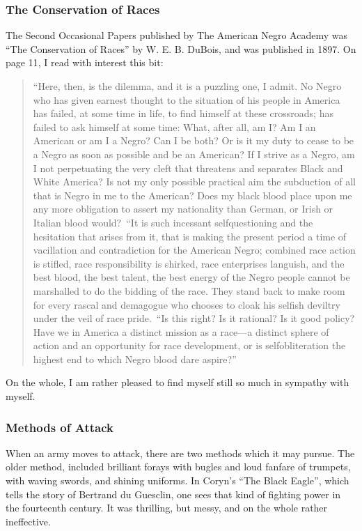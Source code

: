 \documentclass[letterpaper,10pt,english]{jupyterBook}
\begin{document}
\subsubsection{The Conservation of Races}
\label{\detokenize{Volumes/41/06/counsels_of_despair:the-conservation-of-races}}
\sphinxAtStartPar
The Second Occasional Papers published by The American Negro Academy was “The Conservation of Races” by W. E. B. DuBois, and was published in 1897. On page 11, I read with interest this bit:
\begin{quote}

\sphinxAtStartPar
“Here, then, is the dilemma, and it is a puzzling one, I admit. No Negro who has given earnest thought to the situation of his people in America has failed, at some time in life, to find himself at these cross\sphinxhyphen{}roads; has failed to ask himself at some time: What, after all, am I? Am I an American or am I a Negro? Can I be both? Or is it my duty to cease to be a Negro as soon as possible and be an American? If I strive as a Negro, am I not perpetuating the very cleft that threatens and separates Black and White America? Is not my only possible practical aim the subduction of all that is Negro in me to the American? Does my black blood place upon me any more obligation to assert my nationality than German, or Irish or Italian blood would? “It is such incessant self\sphinxhyphen{}questioning and the hesitation that arises from it, that is making the present period a time of vacillation and contradiction for the American Negro; combined race action is stifled, race responsibility is shirked, race enterprises languish, and the best blood, the best talent, the best energy of the Negro people cannot be marshalled to do the bidding of the race. They stand back to make room for every rascal and demagogue who chooses to cloak his selfish deviltry under the veil of race pride. “Is this right? Is it rational? Is it good policy? Have we in America a distinct mission as a race—a distinct sphere of action and an opportunity for race development, or is self\sphinxhyphen{}obliteration the highest end to which Negro blood dare aspire?”
\end{quote}

\sphinxAtStartPar
On the whole, I am rather pleased to find myself still so much in sympathy with myself.


\subsubsection{Methods of Attack}
\label{\detokenize{Volumes/41/06/counsels_of_despair:methods-of-attack}}
\sphinxAtStartPar
When an army moves to attack, there are two methods which it may pursue. The older method, included brilliant forays with bugles and loud fanfare of trumpets, with waving swords, and shining uniforms. In Coryn’s “The Black Eagle”, which tells the story of Bertrand du Guesclin, one sees that kind of fighting power in the fourteenth century. It was thrilling, but messy, and on the whole rather ineffective.
\end{document}
